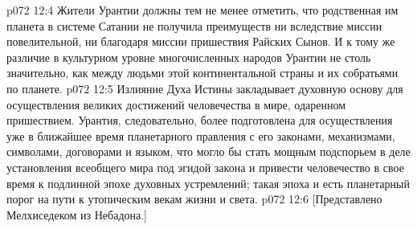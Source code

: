 \vs p072 12:4 \pc Жители Урантии должны тем не менее отметить, что родственная им планета в системе Сатании не получила преимуществ ни вследствие миссии повелительной, ни благодаря миссии пришествия Райских Сынов. И к тому же различие в культурном уровне многочисленных народов Урантии не столь значительно, как между людьми этой континентальной страны и их собратьями по планете.
\vs p072 12:5 Излияние Духа Истины закладывает духовную основу для осуществления великих достижений человечества в мире, одаренном пришествием. Урантия, следовательно, более подготовлена для осуществления уже в ближайшее время планетарного правления с его законами, механизмами, символами, договорами и языком, что могло бы стать мощным подспорьем в деле установления всеобщего мира под эгидой закона и привести человечество в свое время к подлинной эпохе духовных устремлений; такая эпоха и есть планетарный порог на пути к утопическим векам жизни и света.
\vsetoff
\vs p072 12:6 [Представлено Мелхиседеком из Небадона.]
